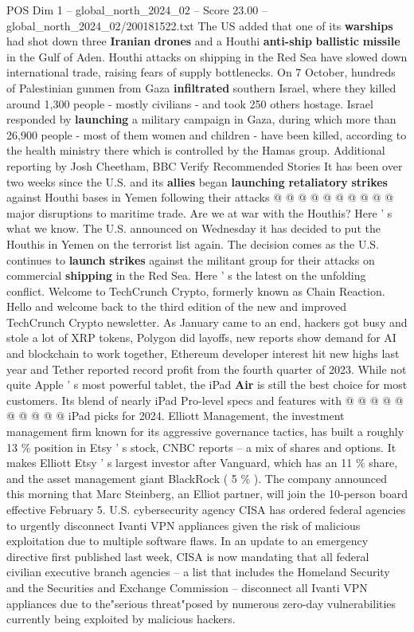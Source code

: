\begin{textsample}{POS Dim 1 – global\_north\_2024\_02 – Score 23.00 – global\_north\_2024\_02/200181522.txt}
The US added that one of its \textbf{warships} had shot down three \textbf{Iranian} \textbf{drones} and a Houthi \textbf{anti-ship} \textbf{ballistic} \textbf{missile} in the Gulf of Aden.
Houthi attacks on shipping in the Red Sea have slowed down international trade, raising fears of supply bottlenecks.
On 7 October, hundreds of Palestinian gunmen from Gaza \textbf{infiltrated} southern Israel, where they killed around 1,300 people - mostly civilians - and took 250 others hostage.
Israel responded by \textbf{launching} a military campaign in Gaza, during which more than 26,900 people - most of them women and children - have been killed, according to the health ministry there which is controlled by the Hamas group.
Additional reporting by Josh Cheetham, BBC Verify Recommended Stories It has been over two weeks since the U.S. and its \textbf{allies} began \textbf{launching} \textbf{retaliatory} \textbf{strikes} against Houthi bases in Yemen following their attacks @ @ @ @ @ @ @ @ @ @ major disruptions to maritime trade.
Are we at war with the Houthis?
Here ' s what we know.
The U.S. announced on Wednesday it has decided to put the Houthis in Yemen on the terrorist list again.
The decision comes as the U.S. continues to \textbf{launch} \textbf{strikes} against the militant group for their attacks on commercial \textbf{shipping} in the Red Sea.
Here ' s the latest on the unfolding conflict.
Welcome to TechCrunch Crypto, formerly known as Chain Reaction.
Hello and welcome back to the third edition of the new and improved TechCrunch Crypto newsletter.
As January came to an end, hackers got busy and stole a lot of XRP tokens, Polygon did layoffs, new reports show demand for AI and blockchain to work together, Ethereum developer interest hit new highs last year and Tether reported record profit from the fourth quarter of 2023.
While not quite Apple ' s most powerful tablet, the iPad \textbf{Air} is still the best choice for most customers.
Its blend of nearly iPad Pro-level specs and features with @ @ @ @ @ @ @ @ @ @ iPad picks for 2024.
Elliott Management, the investment management firm known for its aggressive governance tactics, has built a roughly 13 \% position in Etsy ' s stock, CNBC reports -- a mix of shares and options.
It makes Elliott Etsy ' s largest investor after Vanguard, which has an 11 \% share, and the asset management giant BlackRock ( 5 \% ).
The company announced this morning that Marc Steinberg, an Elliot partner, will join the 10-person board effective February 5.
U.S. cybersecurity agency CISA has ordered federal agencies to urgently disconnect Ivanti VPN appliances given the risk of malicious exploitation due to multiple software flaws.
In an update to an emergency directive first published last week, CISA is now mandating that all federal civilian executive branch agencies -- a list that includes the Homeland Security and the Securities and Exchange Commission -- disconnect all Ivanti VPN appliances due to the"serious threat"posed by numerous zero-day vulnerabilities currently being exploited by malicious hackers.


\end{textsample}
